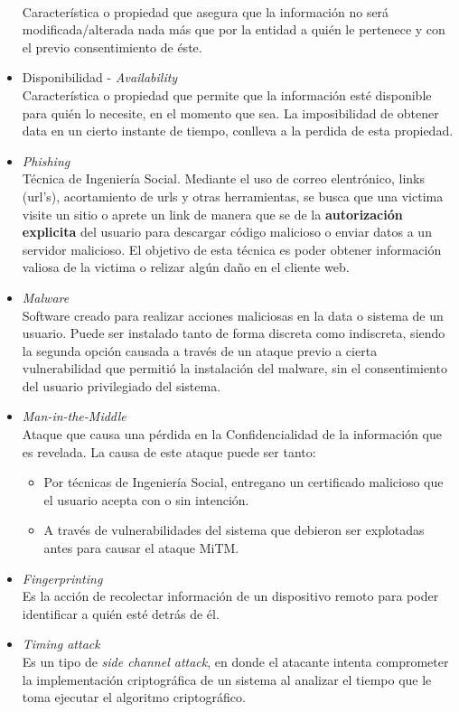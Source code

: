 \begin{itemize}
        \\Característica o propiedad que asegura que la información no será modificada/alterada nada más que por la entidad a quién le pertenece y con el previo consentimiento de éste.
    \item Disponibilidad - \textit{Availability}
        \\Característica o propiedad que permite que la información esté disponible para quién lo necesite, en el momento que sea. La imposibilidad de obtener data en un cierto instante de tiempo, conlleva a la perdida de esta propiedad.
    \item \textit{Phishing}
        \\Técnica de Ingeniería Social. Mediante el uso de correo elentrónico, links (url's), acortamiento de urls y otras herramientas, se busca que una victima visite un sitio o aprete un link de manera que se de la \textbf{autorización explicita} del usuario para descargar código malicioso o enviar datos a un servidor malicioso. El objetivo de esta técnica es poder obtener información valiosa de la victima o relizar algún daño en el cliente web.
    \item \textit{Malware}
        \\Software creado para realizar acciones maliciosas en la data o sistema de un usuario. Puede ser instalado tanto de forma discreta como indiscreta, siendo la segunda opción causada a través de un ataque previo a cierta vulnerabilidad que permitió la instalación del malware, sin el consentimiento del usuario privilegiado del sistema.
    \item \textit{Man-in-the-Middle}
        \\Ataque que causa una pérdida en la Confidencialidad de la información que es revelada. La causa de este ataque puede ser tanto:
            \begin{itemize}
                \item Por técnicas de Ingeniería Social, entregano un certificado malicioso que el usuario acepta con o sin intención.
                \item A través de vulnerabilidades del sistema que debieron ser explotadas antes para causar el ataque MiTM.
            \end{itemize}
    \item \textit{Fingerprinting}
        \\Es la acción de recolectar información de un dispositivo remoto para poder identificar a quién esté detrás de él.
    \item \textit{Timing attack}
        \\Es un tipo de \textit{side channel attack}, en donde el atacante intenta comprometer la implementación criptográfica de un sistema al analizar el tiempo que le toma ejecutar el algoritmo criptográfico.
\end{itemize}
